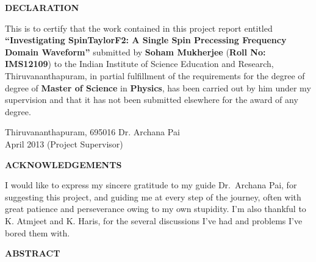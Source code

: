 \documentclass[12pt, a4wide]{report}
\begin{document}
\setcounter{page}{2}
\begin{center}
{\textbf{DECLARATION}}
\end{center}

\noindent
This is to certify that the work contained in this project report entitled
\textbf{``Investigating SpinTaylorF2: A Single Spin Precessing Frequency
Domain Waveform''}  submitted by \textbf{Soham Mukherjee} (\textbf{Roll No:
IMS12109}) to the Indian Institute of Science Education and Research,
Thiruvananthapuram, in partial fulfillment of the requirements for the degree
of degree of {\bf Master of Science} in {\bf Physics}, has been carried out by
him under my supervision and that it has not been submitted elsewhere for the
award of any degree.

\vspace{4cm}

\noindent Thiruvananthapuram, 695016 \hfill Dr. Archana Pai\\
\noindent April 2013 \hfill (Project Supervisor)

\clearpage

\begin{center}
\textbf{ACKNOWLEDGEMENTS}\\
\end{center}

I would like to express my sincere gratitude to my guide Dr.~Archana Pai,
for suggesting this project, and guiding me at every step of the journey, 
often with great patience and perseverance owing to my own stupidity. 
I'm also thankful to K. Atmjeet and K. Haris, for the several discussions I've 
had and problems I've bored them with.


\clearpage

\begin{center}
\textbf{ABSTRACT}\\
\end{center}
\end{document}
